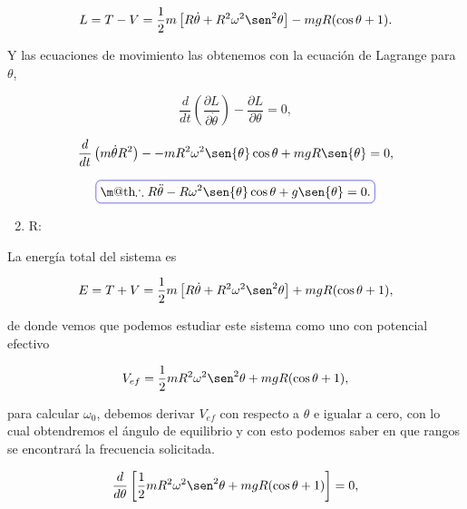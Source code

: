 \documentclass[a4paper,10pt]{article}
\makeatletter
\numberwithin{equation}{section}
\newcommand*{\boxcolor}{blue}
\renewcommand{\boxed}[1]{\textcolor{\boxcolor}{%
\tikz[baseline={([yshift=-1ex]current bounding box.center)}] \node [rectangle, minimum width=1ex,rounded corners,draw] {\normalcolor\m@th$\displaystyle#1$};}}
\makeatother
\begin{document}
\begin{equation}
 L = T - V = \frac{1}{2}m\left[R\dot{\theta} + R^2\omega^2\sen^2{\theta} \right] 
 -  mgR(\cos{\theta} + 1).
\end{equation}

Y las ecuaciones de movimiento las obtenemos con la ecuación de Lagrange para 
$\theta$, 

\begin{equation}
 \frac{d}{dt}\left(\frac{\partial L}{\partial \dot{\theta}}\right) - 
 \frac{\partial L}{\partial \theta} = 0,
\end{equation}

\begin{equation}
 \frac{d}{dt}\left( m\dot{\theta}R^2 \right) - 
 - mR^2\omega^2\sen{\theta}\cos{\theta} + mgR\sen{\theta}  = 0,
\end{equation}

\begin{equation}
 \boxed{\therefore R\ddot{\theta} - R\omega^2\sen{\theta}\cos{\theta} + g\sen{\theta}
 = 0.}
\end{equation}

\begin{enumerate}[label=\alph*)]
\setcounter{enumi}{1}
 \item R:
\end{enumerate}

La energía total del sistema es 

\begin{equation}
 E = T + V =  \frac{1}{2}m\left[R\dot{\theta} + R^2\omega^2\sen^2{\theta} \right] 
 +  mgR(\cos{\theta} + 1),
\end{equation}

de donde vemos que podemos estudiar este sistema como uno con potencial efectivo 

\begin{equation}
 V_{ef} =  \frac{1}{2}mR^2\omega^2\sen^2{\theta}  +  mgR(\cos{\theta} + 1),
\end{equation}

para calcular $\omega_0$, debemos derivar $V_{ef}$ con respecto a $\theta$ e 
igualar a cero, con lo cual obtendremos el ángulo de equilibrio y con esto 
podemos saber en que rangos se encontrará la frecuencia solicitada.

\begin{equation}
 \frac{d}{d\theta} \left[\frac{1}{2}mR^2\omega^2\sen^2{\theta} + 
 mgR(\cos{\theta} + 1) \right] = 0,
\end{equation}
\end{document}
